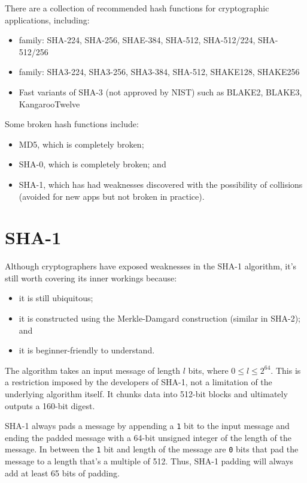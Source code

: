 
There are a collection of recommended hash functions for cryptographic applications, including:
\begin{itemize}
    \item {} family: SHA-224, SHA-256, SHAE-384, SHA-512, SHA-512/224, SHA-512/256
    \item {} family: SHA3-224, SHA3-256, SHA3-384, SHA-512, SHAKE128, SHAKE256
    \item Fast variants of SHA-3 (not approved by NIST) such as BLAKE2, BLAKE3, KangarooTwelve
\end{itemize}

Some broken hash functions include:
\begin{itemize}
    \item MD5, which is completely broken;
    \item SHA-0, which is completely broken; and
    \item SHA-1, which has had weaknesses discovered with the possibility of collisions (avoided for new apps but not broken in practice).
\end{itemize}

\section{SHA-1}
Although cryptographers have exposed weaknesses in the SHA-1 algorithm, it's still worth covering its inner workings because:
\begin{itemize}
    \item it is still ubiquitous;
    \item it is constructed using the Merkle-Damgard construction (similar in SHA-2); and
    \item it is beginner-friendly to understand.
\end{itemize}

The algorithm takes an input message of length $l$ bits, where $0 \leq l \leq 2^{64}$. This is a restriction imposed by the developers of SHA-1, not a limitation of the underlying algorithm itself. It chunks data into 512-bit blocks and ultimately outputs a 160-bit digest.


SHA-1 always pads a message by appending a \texttt{1} bit to the input message and ending the padded message with a 64-bit unsigned integer of the length of the message. In between the \texttt{1} bit and length of the message are \texttt{0} bits that pad the message to a length that's a multiple of 512. Thus, SHA-1 padding will always add at least 65 bits of padding.

